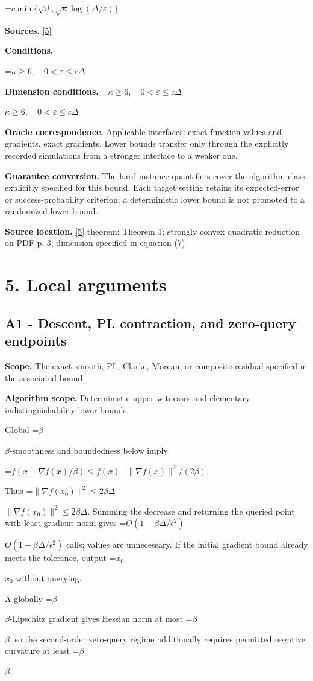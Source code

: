 \documentclass[10pt,a4paper]{article}
\newcommand{\AtlasMath}[1]{\par\begingroup\centering\setbox0=\hbox{$\displaystyle #1$}\ifdim\wd0>1.4\linewidth\typeout{ATLAS WIDE FORMULA: \the\wd0}\fi\ifdim\wd0>\linewidth\resizebox{\linewidth}{!}{\box0}\else\box0\fi\par\endgroup}
\newcommand{\AtlasInlineMath}[1]{\begingroup\setbox0=\hbox{$#1$}\ifdim\wd0>.4\linewidth\endgroup\AtlasMath{#1}\else\endgroup$#1$\fi}
\begin{document}
\AtlasMath{c\min\{\sqrt d,\sqrt\kappa\log(\Delta/\varepsilon)\}}
\textbf{Sources.} \href{https://arxiv.org/pdf/2609.10874}{[5]}

\textbf{Conditions.} 
\AtlasMath{\kappa\ge6,\quad0<\varepsilon\le c\Delta}


\textbf{Dimension conditions.} \AtlasInlineMath{\kappa\ge6,\quad0<\varepsilon\le c\Delta}

\textbf{Oracle correspondence.} Applicable interfaces: exact function values and gradients, exact gradients. Lower bounds transfer only through the explicitly recorded simulations from a stronger interface to a weaker one.

\textbf{Guarantee conversion.} The hard-instance quantifiers cover the algorithm class explicitly specified for this bound. Each target setting retains its expected-error or success-probability criterion; a deterministic lower bound is not promoted to a randomized lower bound.

\textbf{Source location.} \href{https://arxiv.org/pdf/2609.10874}{[5]} theorem: Theorem 1; strongly convex quadratic reduction on PDF p. 3; dimension specified in equation (7)

\section{5. Local arguments}
\subsection{A1 - Descent, PL contraction, and zero-query endpoints}
\textbf{Scope.} The exact smooth, PL, Clarke, Moreau, or composite residual specified in the associated bound.

\textbf{Algorithm scope.} Deterministic upper witnesses and elementary indistinguishability lower bounds.

Global \AtlasInlineMath{\beta}-smoothness and boundedness below imply

\AtlasMath{f(x-\nabla f(x)/\beta)\le f(x)-\|\nabla f(x)\|^2/(2\beta).}

Thus \AtlasInlineMath{\|\nabla f(x_0)\|^2\le2\beta\Delta}. Summing the decrease and returning the queried point with least gradient norm gives \AtlasInlineMath{O(1+\beta\Delta/\epsilon^2)} calls; values are unnecessary. If the initial gradient bound already meets the tolerance, output \AtlasInlineMath{x_0} without querying.

A globally \AtlasInlineMath{\beta}-Lipschitz gradient gives Hessian norm at most \AtlasInlineMath{\beta}, so the second-order zero-query regime additionally requires permitted negative curvature at least \AtlasInlineMath{\beta}.
\end{document}
